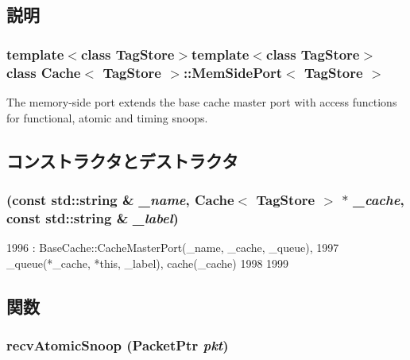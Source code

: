 \subsection{説明}
\subsubsection*{template$<$class TagStore$>$template$<$class TagStore$>$ class Cache$<$ TagStore $>$::MemSidePort$<$ TagStore $>$}

The memory-\/side port extends the base cache master port with access functions for functional, atomic and timing snoops. 

\subsection{コンストラクタとデストラクタ}
\hypertarget{classCache_1_1MemSidePort_ae5fb366af0a2e94b8c3ecb4e8594a6eb}{
\subsubsection[{MemSidePort}]{ (const std::string \& {\em \_\-name}, \/  {\bf Cache}$<$ TagStore $>$ $\ast$ {\em \_\-cache}, \/  const std::string \& {\em \_\-label})}}
\label{classCache_1_1MemSidePort_ae5fb366af0a2e94b8c3ecb4e8594a6eb}



\begin{DoxyCode}
1996     : BaseCache::CacheMasterPort(_name, _cache, _queue),
1997       _queue(*_cache, *this, _label), cache(_cache)
1998 {
1999 }
\end{DoxyCode}


\subsection{関数}
\hypertarget{classCache_1_1MemSidePort_a886d584c81ee4e398ff8069907f6e1a5}{
\subsubsection[{recvAtomicSnoop}]{ recvAtomicSnoop ({\bf PacketPtr} {\em pkt})}}
\label{classCache_1_1MemSidePort_a886d584c81ee4e398ff8069907f6e1a5}



